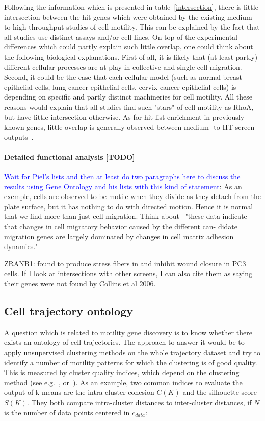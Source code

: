 Following the information which is presented in table~\ref{intersection}, there is little intersection between the hit genes which were obtained by the existing medium- to high-throughput studies of cell motility. This can be explained by the fact that all studies use distinct assays and/or cell lines. On top of the experimental differences which could partly explain such little overlap, one could think about the following biological explanations. First of all, it is likely that (at least partly) different cellular processes are at play in collective and single cell migration. Second, it could be the case that each cellular model (such as normal breast epithelial cells, lung cancer epithelial cells, cervix cancer epithelial cells) is depending on specific and partly distinct machineries for cell motility. All these reasons would explain that all studies find such "stars" of cell motility as RhoA, but have little intersection otherwise. As for hit list enrichment in previously known genes, little overlap is generally observed between medium- to HT screen outputs~\cite{pmid20360735}.

\paragraph{Detailed functional analysis [TODO]}
\textcolor{blue}{Wait for Piel's lists and then at least do two paragraphs here to discuss the results using Gene Ontology and his lists with this kind of statement}:  As an exemple, cells are observed to be motile when they divide as they detach from the plate surface, but it has nothing to do with directed motion. Hence it is normal that we find more than just cell migration. Think about~\cite{pmid18213366} "these data indicate that changes in cell migratory behavior caused by the different can-
didate migration genes are largely dominated by changes in cell matrix adhesion dynamics."

ZRANB1: found to produce stress fibers in \cite{pmid21834987} and inhibit wound closure in PC3 cells. If I look at intersections with other screens, I can also cite them as saying their genes were not found by Collins et al 2006.

\subsection{Cell trajectory ontology}
\label{sec:ontology}
A question which is related to motility gene discovery is to know whether there exists an ontology of cell trajectories. The approach to answer it would be to apply unsupervised clustering methods on the whole trajectory dataset and try to identify a number of motility patterns for which the clustering is of good quality. This is measured by cluster quality indices, which depend on the clustering method (see e.g.~\cite[Chapter~8]{Tan:2005:IDM:1095618}, or~\cite{Halkidi}). As an example, two common indices to evaluate the output of k-means are the intra-cluster cohesion $C(K)$ and the silhouette score $S(K)$. They both compare intra-cluster distances to inter-cluster distances, if $N$ is the number of data points centered in $c_{data}$:

